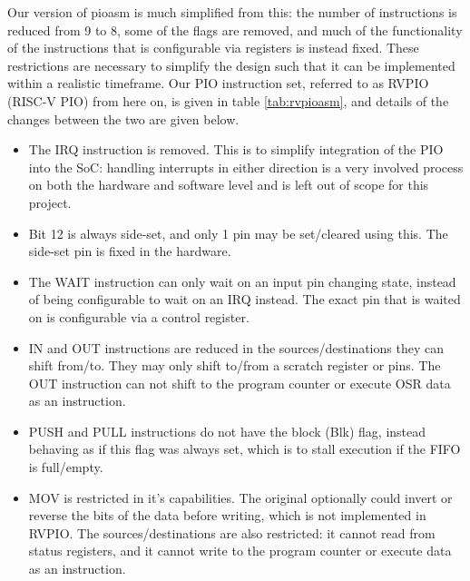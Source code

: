 Our version of pioasm is much simplified from this: the number of instructions is reduced from 9 to 8, some of the flags are removed, and much of the functionality of the instructions that is configurable via registers is instead fixed. These restrictions are necessary to simplify the design such that it can be implemented within a realistic timeframe. Our PIO instruction set, referred to as RVPIO (RISC-V PIO) from here on, is given in table \ref{tab:rvpioasm}, and details of the changes between the two are given below.

\begin{itemize}
    \item The IRQ instruction is removed. This is to simplify integration of the PIO into the SoC: handling interrupts in either direction is a very involved process on both the hardware and software level and is left out of scope for this project.
    \item Bit 12 is always side-set, and only 1 pin may be set/cleared using this. The side-set pin is fixed in the hardware.
    \item The WAIT instruction can only wait on an input pin changing state, instead of being configurable to wait on an IRQ instead. The exact pin that is waited on is configurable via a control register.
    \item IN and OUT instructions are reduced in the sources/destinations they can shift from/to. They may only shift to/from a scratch register or pins. The OUT instruction can not shift to the program counter or execute OSR data as an instruction.
    \item PUSH and PULL instructions do not have the block (Blk) flag, instead behaving as if this flag was always set, which is to stall execution if the FIFO is full/empty.
    \item MOV is restricted in it's capabilities. The original optionally could invert or reverse the bits of the data before writing, which is not implemented in RVPIO. The sources/destinations are also restricted: it cannot read from status registers, and it cannot write to the program counter or execute data as an instruction.
\end{itemize}


